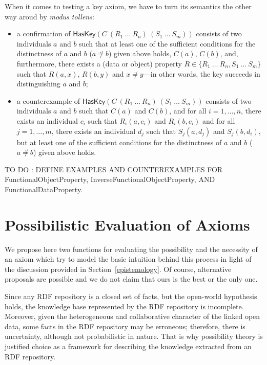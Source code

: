 \documentclass[a4paper]{article}
\newcounter{ex}
\begin{document}
When it comes to testing a key axiom, we have to turn its semantics the other way aroud
by \emph{modus tollens}:
\begin{itemize}
\item a confirmation of $\mathsf{HasKey}(C\ (R_1\ \ldots\ R_n)\ (S_1\ \ldots\ S_m))$
  consists of two individuals $a$ and $b$ such that at least one of the sufficient
  conditions for the distinctness of $a$ and $b$ ($a \not\doteq b$) given above holds,
  $C(a)$, $C(b)$, and, furthermore,
  there exists a (data or object) property $R \in \{ R_1\ \ldots\ R_n, S_1\ \ldots\ S_m \}$
  such that $R(a, x)$, $R(b, y)$ and $x \not\doteq y$---in other words,
  the key succeeds in distinguishing $a$ and $b$;
\item a counterexample of $\mathsf{HasKey}(C\ (R_1\ \ldots\ R_n)\ (S_1\ \ldots\ S_m))$
  consists of two individuals $a$ and $b$ such that $C(a)$ and $C(b)$,
  and for all $i = 1, \ldots, n$, there exists an individual $c_i$
  such that $R_i(a, c_i)$ and $R_i(b, c_i)$
  and for all $j = 1, \ldots, m$, there exists an individual $d_j$
  such that $S_j(a, d_j)$ and $S_j(b, d_i)$,
  but at least one of the sufficient conditions for the distinctness of $a$ and $b$
  ($a \not\doteq b$) given above holds.
\end{itemize}

TO DO : DEFINE EXAMPLES AND COUNTEREXAMPLES FOR \textsf{FunctionalObjectProperty},
\textsf{InverseFunctionalObjectProperty}, AND \textsf{FunctionalDataProperty}.


\section{Possibilistic Evaluation of Axioms}
\label{possibility-theory}

We propose here two functions for evaluating the possibility and the necessity of
an axiom which try to model the basic intuition behind this process in light of
the discussion provided in Section~\ref{epistemology}.
Of course, alternative proposals are possible and we do not claim that ours is the best or
the only one.

Since any RDF repository is a closed set of facts, but the open-world hypothesis
holds, the knowledge base represented by the RDF repository is incomplete.
Moreover, given the heterogeneous and collaborative character of the linked open data,
some facts in the RDF repository may be erroneous; therefore, there is uncertainty,
although not probabilistic in nature. That is why possibility theory is justified
choice as a framework for describing the knowledge extracted from an RDF repository.
\end{document}
